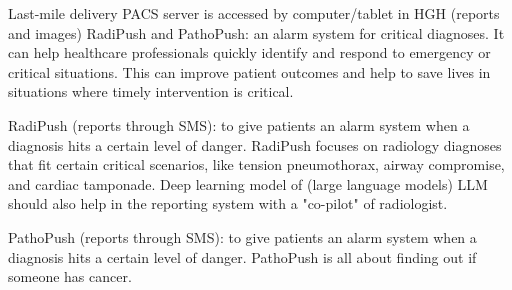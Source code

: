 \documentclass{article}
\begin{document}
\begin{outline}
\1 Last-mile delivery
    \2 PACS server is accessed by computer/tablet in HGH (reports and images)
    \2 RadiPush and PathoPush: an alarm system for critical diagnoses. It can help healthcare professionals quickly identify and respond to emergency or critical situations. This can improve patient outcomes and help to save lives in situations where timely intervention is critical.
    
        \3 RadiPush (reports through SMS): to give patients an alarm system when a diagnosis hits a certain level of danger. RadiPush focuses on radiology diagnoses that fit certain critical scenarios, like tension pneumothorax, airway compromise, and cardiac tamponade. 
        Deep learning model of (large language models) LLM should also help in the reporting system with a "co-pilot" of radiologist. 

        \3 PathoPush (reports through SMS): to give patients an alarm system when a diagnosis hits a certain level of danger. PathoPush is all about finding out if someone has cancer.

 
\end{outline}

\clearpage

\end{document}
